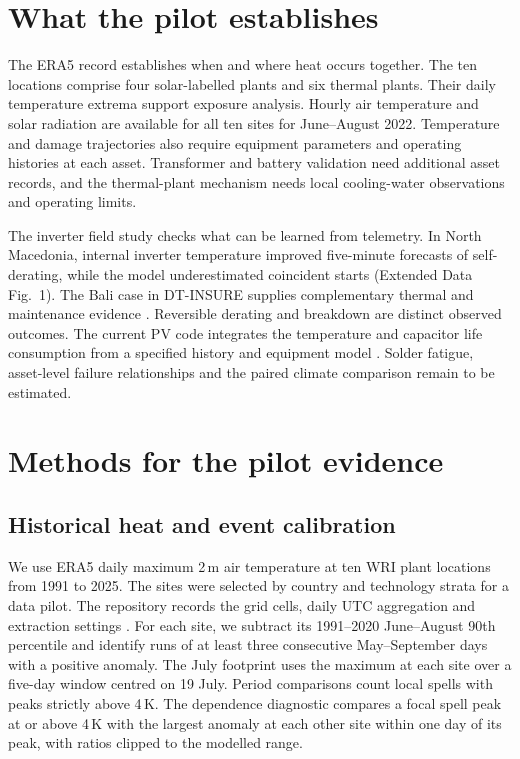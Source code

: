 \documentclass[11pt,a4paper]{article}
\begin{document}
\section*{What the pilot establishes}

The ERA5 record establishes when and where heat occurs together. The ten locations comprise four solar-labelled plants and six thermal plants. Their daily temperature extrema support exposure analysis. Hourly air temperature and solar radiation are available for all ten sites for June--August 2022. Temperature and damage trajectories also require equipment parameters and operating histories at each asset. Transformer and battery validation need additional asset records, and the thermal-plant mechanism needs local cooling-water observations and operating limits.

The inverter field study checks what can be learned from telemetry. In North Macedonia, internal inverter temperature improved five-minute forecasts of self-derating, while the model underestimated coincident starts (Extended Data Fig.~1). The Bali case in DT-INSURE supplies complementary thermal and maintenance evidence \cite{dtinsure}. Reversible derating and breakdown are distinct observed outcomes. The current PV code integrates the temperature and capacitor life consumption from a specified history and equipment model \cite{nichicon}. Solder fatigue, asset-level failure relationships and the paired climate comparison remain to be estimated.

\section*{Methods for the pilot evidence}

\subsection*{Historical heat and event calibration}

We use ERA5 daily maximum 2\,m air temperature at ten WRI plant locations from 1991 to 2025. The sites were selected by country and technology strata for a data pilot. The repository records the grid cells, daily UTC aggregation and extraction settings \cite{era5,heatwave}. For each site, we subtract its 1991--2020 June--August 90th percentile and identify runs of at least three consecutive May--September days with a positive anomaly. The July footprint uses the maximum at each site over a five-day window centred on 19 July. Period comparisons count local spells with peaks strictly above 4\,K. The dependence diagnostic compares a focal spell peak at or above 4\,K with the largest anomaly at each other site within one day of its peak, with ratios clipped to the modelled range.
\end{document}
